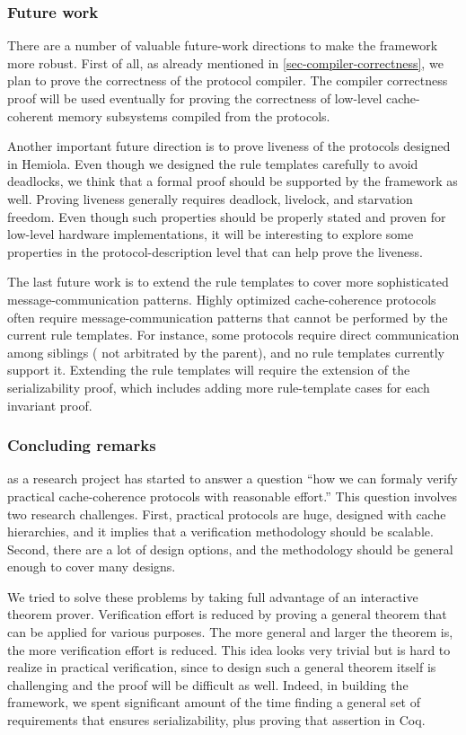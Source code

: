 \subsubsection{Future work}

There are a number of valuable future-work directions to make the \hemiola{} framework more robust.
First of all, as already mentioned in \autoref{sec-compiler-correctness}, we plan to prove the correctness of the protocol compiler.
The compiler correctness proof will be used eventually for proving the correctness of low-level cache-coherent memory subsystems compiled from the \hemiola{} protocols.

Another important future direction is to prove liveness of the protocols designed in Hemiola.
Even though we designed the rule templates carefully to avoid deadlocks, we think that a formal proof should be supported by the framework as well.
Proving liveness generally requires deadlock, livelock, and starvation freedom.
Even though such properties should be properly stated and proven for low-level hardware implementations, it will be interesting to explore some properties in the protocol-description level that can help prove the liveness.

The last future work is to extend the rule templates to cover more sophisticated message-communication patterns.
Highly optimized cache-coherence protocols often require message-communication patterns that cannot be performed by the current rule templates.
For instance, some protocols require direct communication among siblings (\ie{} not arbitrated by the parent), and no rule templates currently support it.
Extending the rule templates will require the extension of the serializability proof, which includes adding more rule-template cases for each invariant proof.

\subsubsection{Concluding remarks}

\hemiola{} as a research project has started to answer a question ``how we can formaly verify practical cache-coherence protocols with reasonable effort.''
This question involves two research challenges.
First, practical protocols are huge, designed with cache hierarchies, and it implies that a verification methodology should be scalable.
Second, there are a lot of design options, and the methodology should be general enough to cover many designs.

We tried to solve these problems by taking full advantage of an interactive theorem prover.
Verification effort is reduced by proving a general theorem that can be applied for various purposes.
The more general and larger the theorem is, the more verification effort is reduced.
This idea looks very trivial but is hard to realize in practical verification, since to design such a general theorem itself is challenging and the proof will be difficult as well.
Indeed, in building the \hemiola{} framework, we spent significant amount of the time finding a general set of requirements that ensures serializability, plus proving that assertion in Coq.

